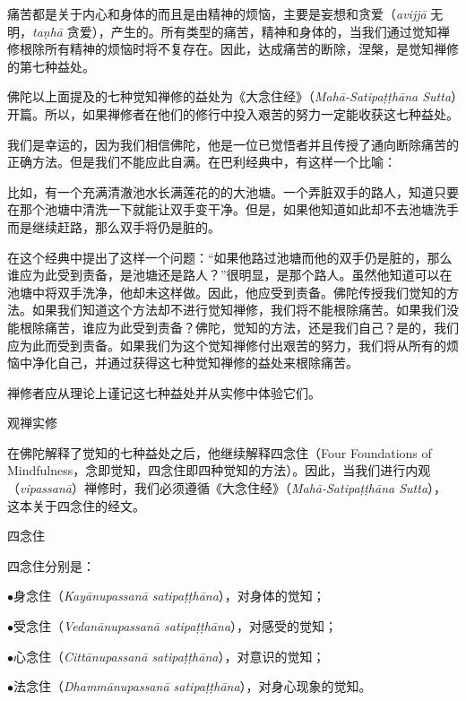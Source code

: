 痛苦都是关于内心和身体的而且是由精神的烦恼，主要是妄想和贪爱（{\it avijj\=a} 无明，{\it ta\d nh\=a} 贪爱），产生的。所有类型的痛苦，\1精神和身体的，当我们通过觉知禅修根除所有精神的烦恼时将不复存在。因此，达成痛苦的断除，涅槃，是觉知禅修的第七种益处。

佛陀以上面提及的七种觉知禅修的益处为《大念住经》（{\it Mah\=a-Satipa\d t\d th\=ana Sutta}）开篇。所以，如果禅修者在他们的修行中投入艰苦的努力一定能收获这七种益处。

我们是幸运的，因为我们相信佛陀，他是一位已觉悟者并且传授了通向断除痛苦的正确方法。但是我们不能应此自满。在巴利经典中，有这样一个比喻：

比如，有一个充满清澈池水长满莲花的的大池塘。一个弄脏双手的路人，知道只要在那个池塘中清洗一下就能让双手变干净。但是，如果他知道如此却不去池塘洗手而是继续赶路，那么双手将仍是脏的。

在这个经典中提出了这样一个问题：“如果他路过池塘而他的双手仍是脏的，那么谁应为此受到责备，是池塘还是路人？”很明显，是那个路人。虽然他知道可以在池塘中将双手洗净，他却未这样做。因此，他应受到责备。佛陀传授我们觉知的方法。如果我们知道这个方法却不进行觉知禅修，我们将不能根除痛苦。如果我们没能根除痛苦，谁应为此受到责备？佛陀，觉知的方法，还是我们自己？是的，我们应为此而受到责备。如果我们为这个觉知禅修付出艰苦的努力，我们将从所有的烦恼中净化自己，并通过获得这七种\1觉知禅修的益处来根除痛苦。

禅修者应从理论上谨记这七种益处并从实修中体验它们。

\subsectnon 观禅实修

在佛陀解释了觉知的七种益处之后，他继续解释四念住（Four Foundations of Mindfulness，念即觉知，四念住即四种觉知的方法）。因此，当我们进行内观（{\it vipassan\=a}）禅修时，我们必须遵循《大念住经》（{\it Mah\=a-Satipa\d t\d th\=ana Sutta}），这本关于四念住的经文。

\ssubsectnon 四念住

四念住分别是：

{
\leftskip=1.6pc
\item{$\bullet$}身念住（{\it Kay\=anupassan\=a satipa\d t\d th\=ana}），对身体的觉知；
\item{$\bullet$}受念住（{\it Vedan\=anupassan\=a satipa\d t\d th\=ana}），对感受的觉知；
\item{$\bullet$}心念住（{\it Citt\=anupassan\=a satipa\d t\d th\=ana}），对意识的觉知；
\item{$\bullet$}法念住（{\it Dhamm\=anupassan\=a satipa\d t\d th\=ana}），对身心现象的觉知。

}

